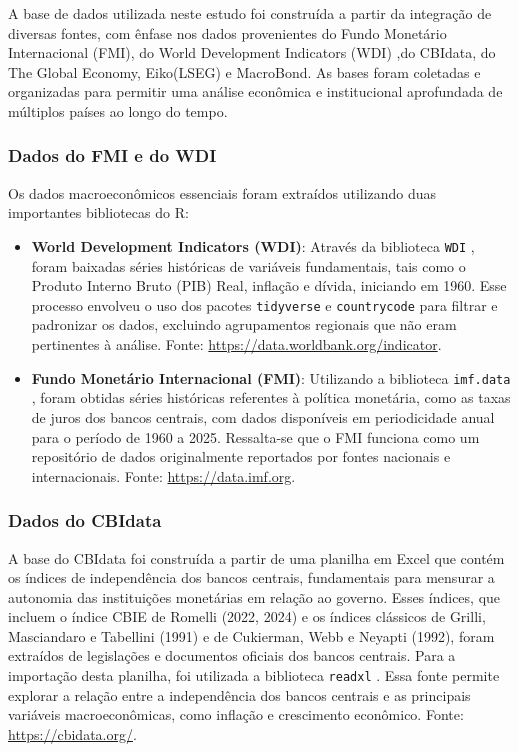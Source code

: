 \documentclass[a4paper,12pt]{article}[abnt2]
\begin{document}
A base de dados utilizada neste estudo foi construída a partir da integração de diversas fontes, com ênfase nos dados provenientes do Fundo Monetário Internacional (FMI), do World Development Indicators (WDI) ,do CBIdata, do The Global Economy, Eiko(LSEG) e MacroBond. As bases foram coletadas e organizadas para permitir uma análise econômica e institucional aprofundada de múltiplos países ao longo do tempo.

\subsubsection{\textbf{Dados do FMI e do WDI}}
Os dados macroeconômicos essenciais foram extraídos utilizando duas importantes bibliotecas do R:
\begin{itemize}
    \item \textbf{World Development Indicators (WDI)}: Através da biblioteca \texttt{WDI} \cite{WDI}, foram baixadas séries históricas de variáveis fundamentais, tais como o Produto Interno Bruto (PIB) Real, inflação e dívida, iniciando em 1960. Esse processo envolveu o uso dos pacotes \texttt{tidyverse} \cite{tidyverse} e \texttt{countrycode} \cite{countrycode} para filtrar e padronizar os dados, excluindo agrupamentos regionais que não eram pertinentes à análise. Fonte: \url{https://data.worldbank.org/indicator}.
    \item \textbf{Fundo Monetário Internacional (FMI)}: Utilizando a biblioteca \texttt{imf.data} \cite{imf.data}, foram obtidas séries históricas referentes à política monetária, como as taxas de juros dos bancos centrais, com dados disponíveis em periodicidade anual para o período de 1960 a 2025. Ressalta-se que o FMI funciona como um repositório de dados originalmente reportados por fontes nacionais e internacionais. Fonte: \url{https://data.imf.org}.
\end{itemize}

\subsubsection{\textbf{Dados do CBIdata}}
A base do CBIdata foi construída a partir de uma planilha em Excel que contém os índices de independência dos bancos centrais, fundamentais para mensurar a autonomia das instituições monetárias em relação ao governo. Esses índices, que incluem o índice CBIE de Romelli (2022, 2024) e os índices clássicos de Grilli, Masciandaro e Tabellini (1991) e de Cukierman, Webb e Neyapti (1992), foram extraídos de legislações e documentos oficiais dos bancos centrais. Para a importação desta planilha, foi utilizada a biblioteca \texttt{readxl} \cite{readxl}. Essa fonte permite explorar a relação entre a independência dos bancos centrais e as principais variáveis macroeconômicas, como inflação e crescimento econômico. Fonte: \url{https://cbidata.org/}.
\end{document}
